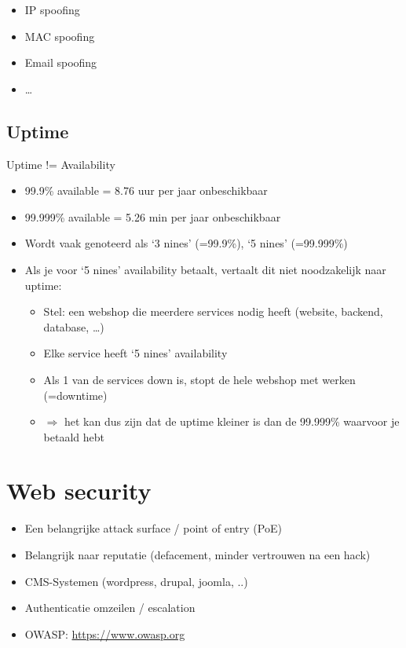 \documentclass{article}
\begin{document}
\begin{itemize}
    \item IP spoofing
    \item MAC spoofing
    \item Email spoofing
    \item \dots
\end{itemize}

\subsection{Uptime}

Uptime != Availability

\begin{itemize}
    \item 99.9\% available = 8.76 uur per jaar onbeschikbaar
    \item 99.999\% available = 5.26 min per jaar onbeschikbaar
    \item Wordt vaak genoteerd als `3 nines' (=99.9\%), `5 nines' (=99.999\%)
    \item Als je voor `5 nines' availability betaalt, vertaalt dit niet noodzakelijk naar uptime:
    \begin{itemize}
        \item Stel: een webshop die meerdere services nodig heeft (website, backend, database, \dots)
        \item Elke service heeft `5 nines' availability
        \item Als 1 van de services down is, stopt de hele webshop met werken (=downtime)
        \item $\Rightarrow$ het kan dus zijn dat de uptime kleiner is dan de 99.999\% waarvoor je betaald hebt
    \end{itemize}

\end{itemize}

\section{Web security}

\begin{itemize}
    \item Een belangrijke attack surface / point of entry (PoE)
    \item Belangrijk naar reputatie (defacement, minder vertrouwen na een hack)
    \item CMS-Systemen  (wordpress, drupal, joomla, ..)
    \item Authenticatie omzeilen / escalation
    \item OWASP: \url{https://www.owasp.org}
\end{itemize}
\end{document}

